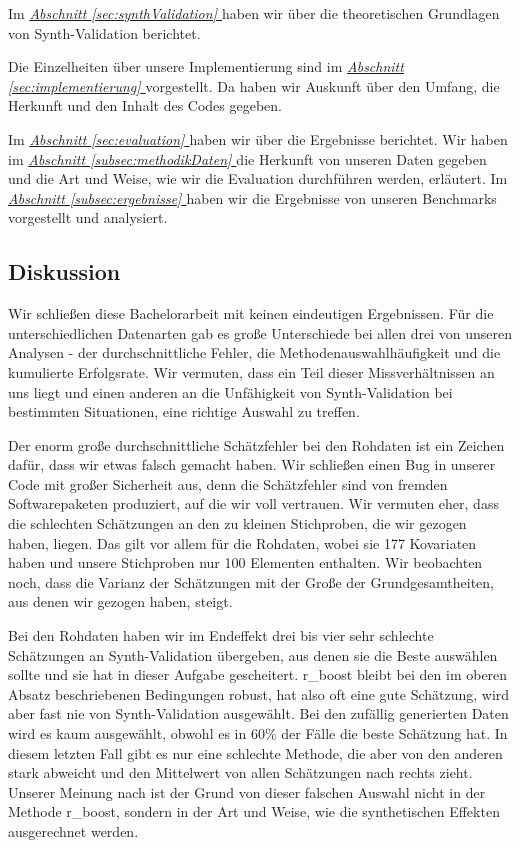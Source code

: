 \documentclass[12pt,a4paper,twoside]{scrartcl}
\numberwithin{equation}{section}
\newcommand{\refsec}[1]{\emph{\hyperref[#1]{Abschnitt \ref*{#1} }}}
\begin{document}
\noindent
Im \refsec{sec:synthValidation} haben wir über die theoretischen Grundlagen von Synth-Validation berichtet.

\noindent
Die Einzelheiten über unsere Implementierung sind im \refsec{sec:implementierung} vorgestellt. Da haben wir Auskunft über den Umfang, die Herkunft und den Inhalt des Codes gegeben.\par

\noindent
Im \refsec{sec:evaluation} haben wir über die Ergebnisse berichtet. Wir haben im \refsec{subsec:methodikDaten} die Herkunft von unseren Daten gegeben und die Art und Weise, wie wir die Evaluation durchführen werden, erläutert. Im \refsec{subsec:ergebnisse} haben wir die Ergebnisse von unseren Benchmarks vorgestellt und analysiert.\par
 	
\subsection{Diskussion}\label{subsec:diskussion}

Wir schließen diese Bachelorarbeit mit keinen eindeutigen Ergebnissen. Für die unterschiedlichen Datenarten gab es große Unterschiede bei allen drei von unseren Analysen - der durchschnittliche Fehler, die Methodenauswahlhäufigkeit und die kumulierte Erfolgsrate. Wir vermuten, dass ein Teil dieser Missverhältnissen an uns liegt und einen anderen an die Unfähigkeit von Synth-Validation bei bestimmten Situationen, eine richtige Auswahl zu treffen. \par

\noindent
Der enorm große durchschnittliche Schätzfehler bei den Rohdaten ist ein Zeichen dafür, dass wir etwas falsch gemacht haben. Wir schließen einen Bug in unserer Code mit großer Sicherheit aus, denn die Schätzfehler sind von fremden Softwarepaketen produziert, auf die wir voll vertrauen. Wir vermuten eher, dass die schlechten Schätzungen an den zu kleinen Stichproben, die wir gezogen haben, liegen. Das gilt vor allem für die Rohdaten, wobei sie 177 Kovariaten haben und unsere Stichproben nur 100 Elementen enthalten. Wir beobachten noch, dass die Varianz der Schätzungen mit der Große der Grundgesamtheiten, aus denen wir gezogen haben, steigt. \par

\noindent
Bei den Rohdaten haben wir im Endeffekt drei bis vier sehr schlechte Schätzungen an Synth-Validation übergeben, aus denen sie die Beste auswählen sollte und sie hat in dieser Aufgabe gescheitert. r\_boost bleibt bei den im oberen Absatz beschriebenen Bedingungen robust, hat also oft eine gute Schätzung, wird aber fast nie von Synth-Validation ausgewählt. Bei den zufällig generierten Daten wird es kaum ausgewählt, obwohl es in 60\% der Fälle die beste Schätzung hat. In diesem letzten Fall gibt es nur eine schlechte Methode, die aber von den anderen stark abweicht und den Mittelwert von allen Schätzungen nach rechts zieht. Unserer Meinung nach ist der Grund von dieser falschen Auswahl nicht in der Methode r\_boost, sondern in der Art und Weise, wie die synthetischen Effekten ausgerechnet werden.\par
\end{document}
